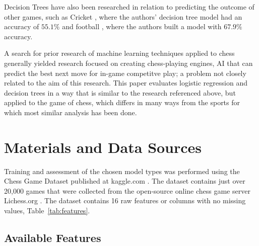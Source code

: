 \documentclass[12pt]{article}
\begin{document}
Decision Trees have also been researched in relation to predicting the outcome of other games, such as Cricket \cite{Kumar2018}, where the authors' decision tree model had an accuracy of $55.1\%$ and football \cite{Jaeyalakshmi2023}, where the authors built a model with $67.9\%$ accuracy.

A search for prior research of machine learning techniques applied to chess generally yielded research focused on creating chess-playing engines, AI that can predict the best next move for in-game competitve play; a problem not closely related to the aim of this research. This paper evaluates logistic regression and decision trees in a way that is similar to the research referenced above, but applied to the game of chess, which differs in many ways from the sports for which most similar analysis has been done.

\section{Materials and Data Sources}
\label{sec:dataset}

Training and assessment of the chosen model types was performed using the Chess Game Dataset published at kaggle.com \cite{chessDataset}. The dataset contains just over 20,000 games that were collected from the open-source online chess game server Lichess.org \cite{lichessOrg}. The dataset contains 16 raw features or columns with no missing values, Table~\ref{tab:features}.

\subsection{Available Features}
\label{sec:features}
\end{document}
